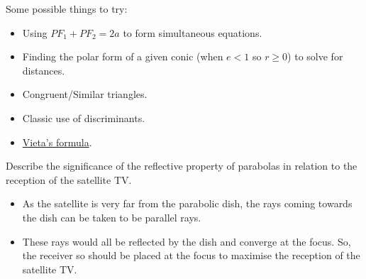   \begin{note}
    Some possible things to try:
    \begin{itemize}
      \item Using \(PF_1+PF_2=2a\) to form simultaneous equations.
      \item Finding the polar form of a given conic (when \(e<1\) so \(r \geq 0\)) to solve for distances.
      \item Congruent/Similar triangles.
      \item Classic use of discriminants.
      \item \hyperlink{vieta}{Vieta's formula}.
    \end{itemize}
  \end{note}
  \begin{example}{}{}
    Describe the significance of the reflective property of parabolas in relation to the reception of the satellite TV.
    \begin{itemize}
      \item As the satellite is very far from the parabolic dish, the rays coming towards the dish can be taken to be parallel rays.
      \item These rays would all be reflected by the dish and converge at the focus. So, the receiver so should be placed at the focus to maximise the reception of the satellite TV. 
    \end{itemize}
  \end{example}
